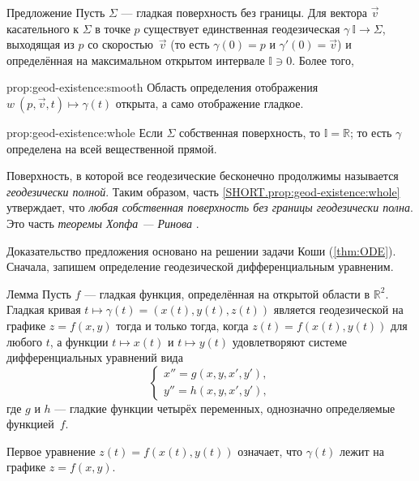 \begin{thm}{Предложение}\label{prop:geod-existence} 
Пусть $\Sigma$ --- гладкая поверхность без границы.
Для вектора ${\vec v}$ касательного к $\Sigma$ в точке $p$ существует единственная геодезическая $\gamma\:\mathbb{I}\to \Sigma$, выходящая из $p$ со скоростью~${\vec v}$ (то есть $\gamma(0)=p$ и $\gamma'(0)={\vec v}$) и определённая на максимальном открытом интервале $\mathbb{I}\ni 0$.
Более того,
\begin{subthm}{prop:geod-existence:smooth}
Область определения отображения $w\:(p,{\vec v},t)\mapsto \gamma(t)$ открыта, а само отображение гладкое.
\end{subthm}

\begin{subthm}{prop:geod-existence:whole}
Если $\Sigma$ собственная поверхность, то $\mathbb{I}=\mathbb{R}$; то есть $\gamma$ определена на всей вещественной прямой.
\end{subthm}

\end{thm}

Поверхность, в которой все геодезические бесконечно продолжимы называется \emph{геодезически полной}.
Таким образом, часть \ref{SHORT.prop:geod-existence:whole} утверждает, что \textit{любая собственная поверхность без границы геодезически полна}.
Это часть \emph{теоремы Хопфа --- Ринова} \cite{hopf-rinow}.

Доказательство предложения основано на решении задачи Коши (\ref{thm:ODE}).
Сначала, запишем определение геодезической дифференциальным уравненим.


\begin{thm}{Лемма}\label{lem:geodesic=2nd-order}
Пусть $f$ --- гладкая функция, определённая на открытой области в $\mathbb{R}^2$.
Гладкая кривая $t\mapsto \gamma(t)=(x(t),y(t),z(t))$ является геодезической на графике $z=f(x,y)$ тогда и только тогда, когда $z(t)=f(x(t),y(t))$ для любого $t$, а функции $t\mapsto x(t)$ и $t\mapsto y(t)$ удовлетворяют системе дифференциальных уравнений вида
\[
\begin{cases}
x''=g(x,y,x',y'),
\\
y''=h(x,y,x',y'),
\end{cases}
\]
где $g$ и $h$ --- гладкие функции четырёх переменных, однозначно определяемые функцией~$f$.
\end{thm}

Первое уравнение $z(t)=f(x(t),y(t))$ означает, что $\gamma(t)$ лежит на графике $z=f(x,y)$.

